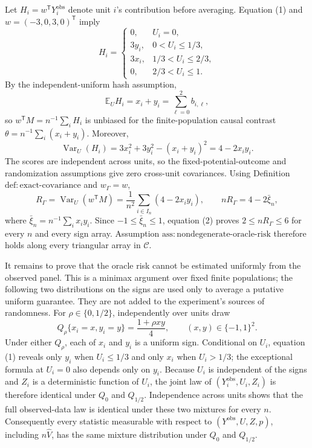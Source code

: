 Let \(H_i=w^{\mathsf T}Y_i^{\mathrm{obs}}\) denote unit \(i\)'s contribution before averaging.  Equation (1) and \(w=(-3,0,3,0)^{\mathsf T}\) imply
\[
H_i=
\begin{cases}
0,&U_i=0,\\
3y_i,&0<U_i\le1/3,\\
3x_i,&1/3<U_i\le2/3,\\
0,&2/3<U_i\le1.
\end{cases}
\]
By the independent-uniform hash assumption,
\[
\mathbb E_U H_i=x_i+y_i=\sum_{\ell=0}^2b_{i,\ell},
\]
so \(w^{\mathsf T}M=n^{-1}\sum_iH_i\) is unbiased for the finite-population causal contrast \(\theta=n^{-1}\sum_i(x_i+y_i)\).  Moreover,
\[
\operatorname{Var}_U(H_i)
=3x_i^2+3y_i^2-(x_i+y_i)^2
=4-2x_i y_i.
\]
The scores are independent across units, so the fixed-potential-outcome and randomization assumptions give zero cross-unit covariances.  Using Definition \(\mathrm{def:exact\text{-}covariance}\) and \(w_\Gamma=w\),
\[
R_\Gamma
=\operatorname{Var}_U(w^{\mathsf T}M)
=\frac1{n^2}\sum_{i\in I_n}(4-2x_i y_i),
\qquad
nR_\Gamma=4-2\bar\xi_n,
\tag{2}
\]
where \(\bar\xi_n=n^{-1}\sum_i x_i y_i\).  Since \(-1\le\bar\xi_n\le1\), equation (2) proves \(2\le nR_\Gamma\le6\) for every \(n\) and every sign array.  Assumption \(\mathrm{ass:nondegenerate\text{-}oracle\text{-}risk}\) therefore holds along every triangular array in \(\mathcal C\).

It remains to prove that the oracle risk cannot be estimated uniformly from the observed panel.  This is a minimax argument over fixed finite populations; the following two distributions on the signs are used only to average a putative uniform guarantee.  They are not added to the experiment's sources of randomness.  For \(\rho\in\{0,1/2\}\), independently over units draw
\[
Q_\rho\{x_i=x,y_i=y\}=\frac{1+\rho xy}{4},
\qquad (x,y)\in\{-1,1\}^2.
\tag{3}
\]
Under either \(Q_\rho\), each of \(x_i\) and \(y_i\) is a uniform sign.  Conditional on \(U_i\), equation (1) reveals only \(y_i\) when \(U_i\le1/3\) and only \(x_i\) when \(U_i>1/3\); the exceptional formula at \(U_i=0\) also depends only on \(y_i\).  Because \(U_i\) is independent of the signs and \(Z_i\) is a deterministic function of \(U_i\), the joint law of \((Y_i^{\mathrm{obs}},U_i,Z_i)\) is therefore identical under \(Q_0\) and \(Q_{1/2}\).  Independence across units shows that the full observed-data law is identical under these two mixtures for every \(n\).  Consequently every statistic measurable with respect to \((Y^{\mathrm{obs}},U,Z,p)\), including \(n\widehat V\), has the same mixture distribution under \(Q_0\) and \(Q_{1/2}\).

